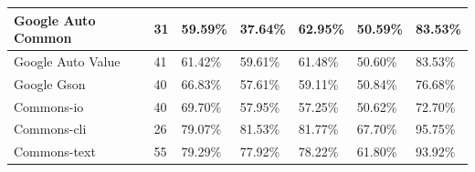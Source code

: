 \documentclass[conference,draftclsnofoot,onecolumn]{IEEEtran}
\begin{document}
\begin{table}[ht]
\begin{tabular}{|l|l|l|l|l|l|l|}
Google Auto   Common  & 31                   & 59.59\%                           & 37.64\%                                                & 62.95\%                            & 50.59\%                                                                                                                                    & 83.53\%                                                                                                                                    \\ \hline
Google Auto   Value   & 41                   & 61.42\%                           & 59.61\%                                                & 61.48\%                            & 50.60\%                                                                                                                                    & 83.53\%                                                                                                                                    \\ \hline
Google Gson           & 40                   & 66.83\%                           & 57.61\%                                                & 59.11\%                            & 50.84\%                                                                                                                                    & 76.68\%                                                                                                                                    \\ \hline
Commons-io            & 40                   & 69.70\%                           & 57.95\%                                                & 57.25\%                            & 50.62\%                                                                                                                                    & 72.70\%                                                                                                                                    \\ \hline
Commons-cli           & 26                   & 79.07\%                           & 81.53\%                                                & 81.77\%                            & 67.70\%                                                                                                                                    & 95.75\%                                                                                                                                    \\ \hline
Commons-text          & 55                   & 79.29\%                           & 77.92\%                                                & 78.22\%                            & 61.80\%                                                                                                                                    & 93.92\%                                                                                                                                    \\ \hline

\end{tabular}
\end{table}
\end{document}
